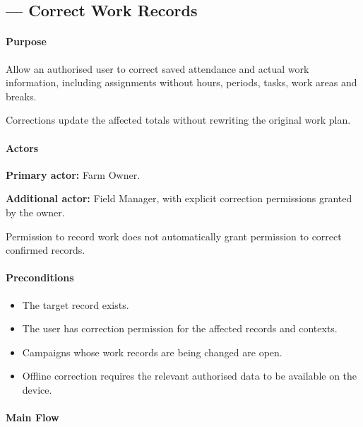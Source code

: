 \subsection{ --- Correct Work Records}
\label{uc:11}

\paragraph{Purpose}

Allow an authorised user to correct saved attendance
and actual work information, including assignments without hours,
periods, tasks, work areas and breaks.

Corrections update the affected totals
without rewriting the original work plan.


\paragraph{Actors}

\textbf{Primary actor:} Farm Owner.

\textbf{Additional actor:} Field Manager,
with explicit correction
permissions granted by the owner.

Permission to record work does not automatically
grant permission to correct confirmed records.

\paragraph{Preconditions}

\begin{itemize}
    \item The target record exists.
    \item The user has correction permission
    for the affected records and contexts.
    \item Campaigns whose work records
    are being changed are open.
    \item Offline correction requires
    the relevant authorised data
    to be available on the device.
\end{itemize}

\paragraph{Main Flow}


